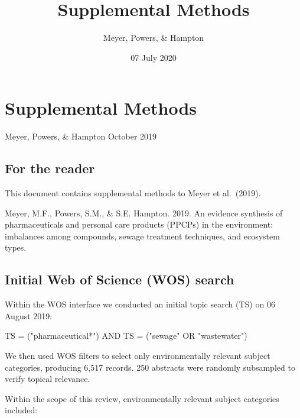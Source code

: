 \documentclass[
]{article}
\title{Supplemental Methods}
\author{Meyer, Powers, \& Hampton}
\date{07 July 2020}
\begin{document}
\maketitle

\hypertarget{supplemental-methods}{%
\section{Supplemental Methods}\label{supplemental-methods}}

Meyer, Powers, \& Hampton  October 2019

\hypertarget{for-the-reader}{%
\subsection{For the reader}\label{for-the-reader}}

This document contains supplemental methods to Meyer et al.~(2019).

Meyer, M.F., Powers, S.M., \& S.E. Hampton. 2019. An evidence synthesis
of pharmaceuticals and personal care products (PPCPs) in the
environment: imbalances among compounds, sewage treatment techniques,
and ecosystem types.

\hypertarget{initial-web-of-science-wos-search}{%
\subsection{Initial Web of Science (WOS)
search}\label{initial-web-of-science-wos-search}}

Within the WOS interface we conducted an initial topic search (TS) on 06
August 2019:

\begin{center}
TS = ("pharmaceutical*") AND TS = ("sewage" OR "wastewater")
\end{center}

We then used WOS filters to select only environmentally relevant subject
categories, producing 6,517 records. 250 abstracts were randomly
subsampled to verify topical relevance.

Within the scope of this review, environmentally relevant subject
categories included:
\end{document}
